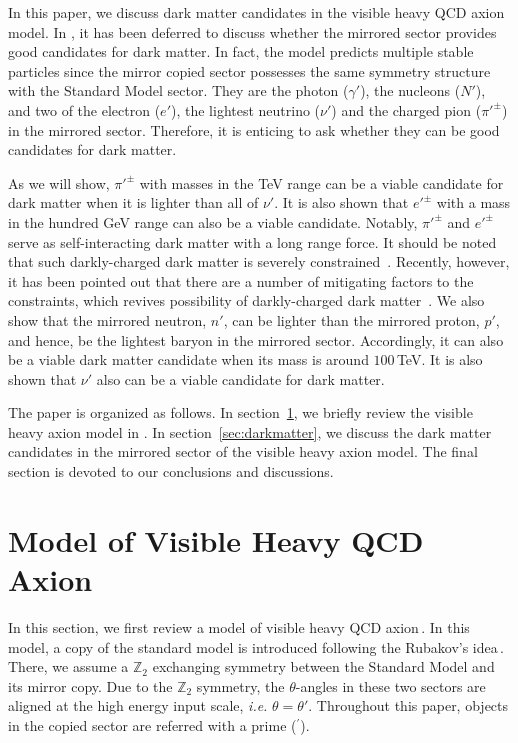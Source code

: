 \documentclass[aps,amsmath,preprint,epsf,superscriptaddress,nofootinbib,notitlepage]{revtex4-1}
\begin{document}
In this paper, we discuss dark matter candidates in the visible heavy QCD axion model.
In \cite{Fukuda:2015ana}, 
it has been deferred to discuss whether the mirrored sector provides good candidates for dark matter.
In fact, the model predicts multiple stable particles since the mirror copied sector possesses the same symmetry structure with the Standard Model sector.
They are the photon ($\gamma'$), the nucleons ($N'$), and two of the electron ($e'$), the lightest neutrino ($\nu'$) and the charged pion ($\pi'^\pm$)
in the mirrored sector.
Therefore, it is enticing to ask whether they can be good candidates for dark matter.



As we will show, $\pi'^\pm$ with masses in the TeV range can be a viable candidate for dark matter when it is lighter than all of $\nu'$.
It is also shown that $e'^\pm$ with a mass in the hundred GeV range can also be a viable candidate.
Notably, $\pi'^\pm$ and $e'^\pm$ serve as self-interacting dark matter with a long range force.
It should be noted that such darkly-charged dark matter is severely constrained~\cite{Ackerman:mha,Feng:2009mn,Feng:2009hw}.
Recently, however, it has been pointed out that there are a number of mitigating factors to the constraints,
which revives possibility of darkly-charged dark matter~\cite{Agrawal:2016quu}.
We also show that the mirrored neutron, $n'$, can be lighter than the mirrored proton, $p'$, and hence, be the lightest baryon in the mirrored sector.  
Accordingly,  it can also be  a viable dark matter candidate when its mass is around $100$\,TeV.
It is also shown that $\nu'$  also can be a viable candidate for dark matter.


The paper is organized as follows. 
In section~\ref{sec:model}, we briefly review the visible heavy axion model in \cite{Fukuda:2015ana}. 
In section~\ref{sec:darkmatter}, we discuss the dark matter candidates in the mirrored sector of the visible heavy axion model.
The final section is devoted to our conclusions and discussions.

\section{Model of Visible Heavy QCD Axion}
\label{sec:model}
In this section, we first review a model of visible heavy QCD axion\,\cite{Fukuda:2015ana}. 
In this model, a 
copy of the standard model is introduced following the Rubakov's idea\,\cite{Rubakov:1997vp}. 
There, we assume  a $\mathbb Z_2$ exchanging symmetry between 
the Standard Model and its mirror copy. 
Due to the  $\mathbb Z_2$ symmetry,  the $\theta$-angles in these two sectors 
are aligned at the high energy input scale, {\it i.e.} $\theta = \theta'$. 
Throughout this paper, objects in the copied sector are referred with a prime ($^\prime$).
\end{document}
